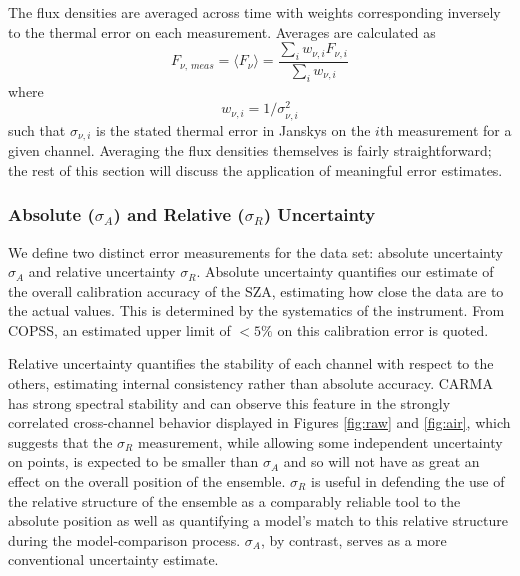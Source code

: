 \documentclass{article}
\begin{document}
	The flux densities are averaged across time with weights corresponding inversely to the thermal error on each measurement.
	Averages are calculated as
	$$F_{\nu,\,meas} = \langle F_{\nu} \rangle = \frac{ \sum_{i} w_{\nu, i} F_{\nu,i} }{ \sum_{i} w_{\nu, i} }$$
	where $$w_{\nu, i} = 1/\sigma_{\nu, i}^{2}$$
	such that $\sigma_{\nu, i}$ is the stated thermal error in Janskys on the $i$th measurement for a given channel.
	Averaging the flux densities themselves is fairly straightforward; the rest of this section will discuss the application
	of meaningful error estimates.

\subsubsection{Absolute ($\sigma_{A}$) and Relative ($\sigma_{R}$) Uncertainty} \label{s:error}
	We define two distinct error measurements for the data set: absolute uncertainty $\sigma_{A}$ and relative uncertainty $\sigma_{R}$.
	Absolute uncertainty quantifies our estimate of the overall calibration accuracy of the SZA, estimating how close the data are to the actual values.  This is determined by the systematics of the instrument.
	From COPSS, an estimated upper limit of $<5\%$ on this calibration error is quoted.

	Relative uncertainty quantifies the stability of each channel with respect to the others, estimating internal consistency rather than absolute accuracy.
	CARMA has strong spectral stability and can observe this feature in the strongly correlated cross-channel behavior displayed in Figures \ref{fig:raw} and \ref{fig:air}, which suggests that the $\sigma_{R}$ measurement, while allowing some independent uncertainty on points, is expected to be smaller than $\sigma_{A}$ and so will not have as great an effect on the overall position of the ensemble.
	$\sigma_{R}$ is useful in defending the use of the relative structure of the ensemble as a comparably reliable tool to the absolute position as well as quantifying a model's match to this relative structure during the model-comparison process.
	$\sigma_{A}$, by contrast, serves as a more conventional uncertainty estimate.
\end{document}
